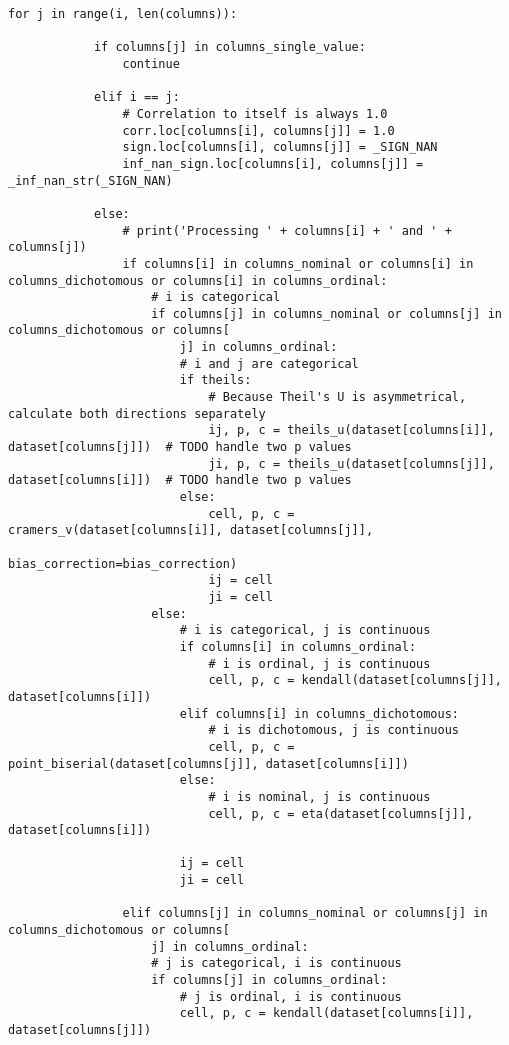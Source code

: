 \begin{lstlisting}[basicstyle=\tiny, style=py, caption={Implementation of \textit{compute correlations}}, label=lst:compute_correlation]
        for j in range(i, len(columns)):
    
            if columns[j] in columns_single_value:
                continue
    
            elif i == j:
                # Correlation to itself is always 1.0
                corr.loc[columns[i], columns[j]] = 1.0
                sign.loc[columns[i], columns[j]] = _SIGN_NAN
                inf_nan_sign.loc[columns[i], columns[j]] = _inf_nan_str(_SIGN_NAN)
    
            else:
                # print('Processing ' + columns[i] + ' and ' + columns[j])
                if columns[i] in columns_nominal or columns[i] in columns_dichotomous or columns[i] in columns_ordinal:
                    # i is categorical
                    if columns[j] in columns_nominal or columns[j] in columns_dichotomous or columns[
                        j] in columns_ordinal:
                        # i and j are categorical
                        if theils:
                            # Because Theil's U is asymmetrical, calculate both directions separately
                            ij, p, c = theils_u(dataset[columns[i]], dataset[columns[j]])  # TODO handle two p values
                            ji, p, c = theils_u(dataset[columns[j]], dataset[columns[i]])  # TODO handle two p values
                        else:
                            cell, p, c = cramers_v(dataset[columns[i]], dataset[columns[j]],
                                                   bias_correction=bias_correction)
                            ij = cell
                            ji = cell
                    else:
                        # i is categorical, j is continuous
                        if columns[i] in columns_ordinal:
                            # i is ordinal, j is continuous
                            cell, p, c = kendall(dataset[columns[j]], dataset[columns[i]])
                        elif columns[i] in columns_dichotomous:
                            # i is dichotomous, j is continuous
                            cell, p, c = point_biserial(dataset[columns[j]], dataset[columns[i]])
                        else:
                            # i is nominal, j is continuous
                            cell, p, c = eta(dataset[columns[j]], dataset[columns[i]])
    
                        ij = cell
                        ji = cell
    
                elif columns[j] in columns_nominal or columns[j] in columns_dichotomous or columns[
                    j] in columns_ordinal:
                    # j is categorical, i is continuous
                    if columns[j] in columns_ordinal:
                        # j is ordinal, i is continuous
                        cell, p, c = kendall(dataset[columns[i]], dataset[columns[j]])
    

\end{lstlisting}
